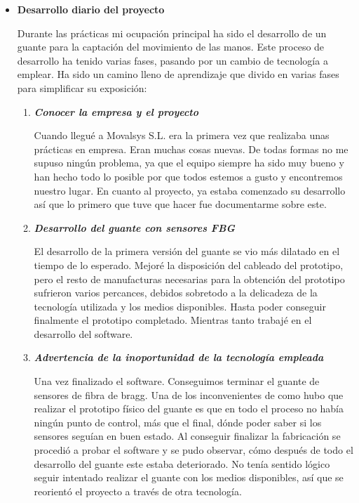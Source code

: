 		\begin{itemize}
			\item \textbf{Desarrollo diario del proyecto}
			 
			\smallskip	
			Durante las prácticas mi ocupación principal ha sido el desarrollo de un guante para la captación del movimiento de las manos. Este proceso de desarrollo ha tenido varias fases, pasando por un cambio de tecnología a emplear. Ha sido un camino lleno de aprendizaje que divido en varias fases para simplificar su exposición:

		
			\begin{enumerate}
				\item \textbf{\textit{Conocer la empresa y el proyecto}}
				
				\smallskip	
				Cuando llegué a Movalsys S.L. era la primera vez que realizaba unas prácticas en empresa. Eran muchas cosas nuevas. De todas formas no me supuso ningún problema, ya que el equipo siempre ha sido muy bueno y han hecho todo lo posible por que todos estemos a gusto y encontremos nuestro lugar. En cuanto al proyecto, ya estaba comenzado su desarrollo así que lo primero que tuve que hacer fue documentarme sobre este. 
				\smallskip
				
				\item \textbf{\textit{Desarrollo del guante con sensores FBG}}
				
				\smallskip	
				El desarrollo de la primera versión del guante se vio más dilatado en el tiempo de lo esperado. Mejoré la disposición del cableado del prototipo, pero el resto de manufacturas necesarias para la obtención del prototipo sufrieron varios percances, debidos sobretodo a la delicadeza de la tecnología utilizada y los medios disponibles. Hasta poder conseguir finalmente el prototipo completado. Mientras tanto trabajé en el desarrollo del software. 
				
				\smallskip
				
				\item \textbf{\textit{Advertencia de la inoportunidad de la tecnología empleada}}
				
				\smallskip	
				Una vez finalizado el software. Conseguimos terminar el guante de sensores de fibra de bragg. Una de los inconvenientes de como hubo que 
				realizar el prototipo físico del guante es que en todo el proceso no había ningún punto de control, más que el final, dónde poder saber si los sensores seguían en buen estado. Al conseguir finalizar la fabricación se procedió a probar el software y se pudo observar, cómo después de todo el desarrollo del guante este estaba deteriorado. No tenía sentido lógico seguir intentado realizar el guante con los medios disponibles, así que se reorientó el proyecto a través de otra tecnología. 
				

\end{enumerate}
\end{itemize}
